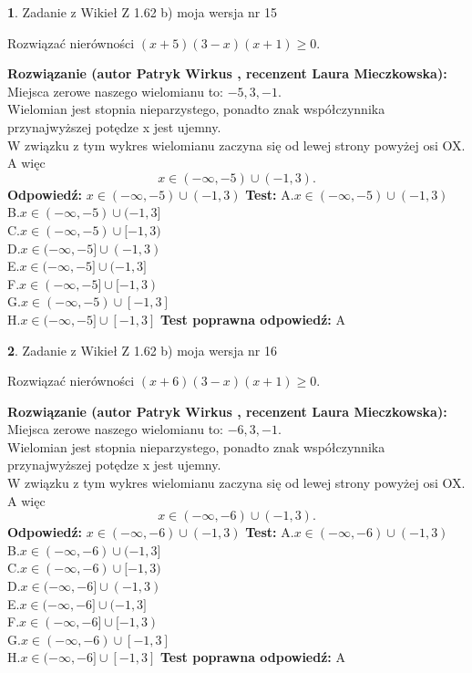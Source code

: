 \documentclass[12pt, a4paper]{article}
\theoremstyle{definition} %
\newtheorem{zad}{}
\newcommand{\zadStart}[1]{\begin{zad}#1\newline}
\newcommand{\zadStop}{\end{zad}}
\newcommand{\rozwStart}[2]{\noindent \textbf{Rozwiązanie (autor #1 , recenzent #2): }\newline}
\newcommand{\rozwStop}{\newline}
\newcommand{\odpStart}{\noindent \textbf{Odpowiedź:}\newline}
\newcommand{\odpStop}{\newline}
\newcommand{\testStart}{\noindent \textbf{Test:}\newline}
\newcommand{\testStop}{\newline}
\newcommand{\kluczStart}{\noindent \textbf{Test poprawna odpowiedź:}\newline}
\newcommand{\kluczStop}{\newline}
\begin{document}
\zadStart{Zadanie z Wikieł Z 1.62 b) moja wersja nr 15}

Rozwiązać nierówności $(x+5)(3-x)(x+1)\ge0$.
\zadStop
\rozwStart{Patryk Wirkus}{Laura Mieczkowska}
Miejsca zerowe naszego wielomianu to: $-5, 3, -1$.\\
Wielomian jest stopnia nieparzystego, ponadto znak współczynnika przy\linebreak najwyższej potędze x jest ujemny.\\ W związku z tym wykres wielomianu zaczyna się od lewej strony powyżej osi OX. A więc $$x \in (-\infty,-5) \cup (-1,3).$$
\rozwStop
\odpStart
$x \in (-\infty,-5) \cup (-1,3)$
\odpStop
\testStart
A.$x \in (-\infty,-5) \cup (-1,3)$\\
B.$x \in (-\infty,-5) \cup (-1,3]$\\
C.$x \in (-\infty,-5) \cup [-1,3)$\\
D.$x \in (-\infty,-5] \cup (-1,3)$\\
E.$x \in (-\infty,-5] \cup (-1,3]$\\
F.$x \in (-\infty,-5] \cup [-1,3)$\\
G.$x \in (-\infty,-5) \cup [-1,3]$\\
H.$x \in (-\infty,-5] \cup [-1,3]$
\testStop
\kluczStart
A
\kluczStop



\zadStart{Zadanie z Wikieł Z 1.62 b) moja wersja nr 16}

Rozwiązać nierówności $(x+6)(3-x)(x+1)\ge0$.
\zadStop
\rozwStart{Patryk Wirkus}{Laura Mieczkowska}
Miejsca zerowe naszego wielomianu to: $-6, 3, -1$.\\
Wielomian jest stopnia nieparzystego, ponadto znak współczynnika przy\linebreak najwyższej potędze x jest ujemny.\\ W związku z tym wykres wielomianu zaczyna się od lewej strony powyżej osi OX. A więc $$x \in (-\infty,-6) \cup (-1,3).$$
\rozwStop
\odpStart
$x \in (-\infty,-6) \cup (-1,3)$
\odpStop
\testStart
A.$x \in (-\infty,-6) \cup (-1,3)$\\
B.$x \in (-\infty,-6) \cup (-1,3]$\\
C.$x \in (-\infty,-6) \cup [-1,3)$\\
D.$x \in (-\infty,-6] \cup (-1,3)$\\
E.$x \in (-\infty,-6] \cup (-1,3]$\\
F.$x \in (-\infty,-6] \cup [-1,3)$\\
G.$x \in (-\infty,-6) \cup [-1,3]$\\
H.$x \in (-\infty,-6] \cup [-1,3]$
\testStop
\kluczStart
A
\kluczStop
\end{document}
